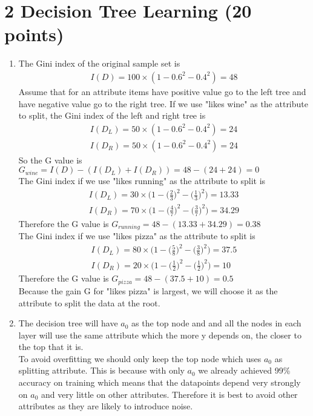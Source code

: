 \documentclass[12pt]{article}
\begin{document}
\section*{2 Decision Tree Learning (20 points)}
\begin{enumerate}[label=(\alph*)]
	\item	
	The Gini index of the original sample set is
	\begin{align*}
		I(D) = 100 \times (1 - 0.6^2 - 0.4^2) = 48
	\end{align*}
	Assume that for an attribute items have positive value go to the left tree and have negative value go to the right tree. If we use "likes wine" as the attribute to split, the Gini index of the left and right tree is
	\begin{align*}
		I(D_L) = 50 \times (1 - 0.6^2 - 0.4^2) = 24\\
		I(D_R) = 50 \times (1 - 0.6^2 - 0.4^2) = 24
	\end{align*}
	So the G value is $G_{wine} = I(D) - (I(D_L) + I(D_R)) = 48 - (24 + 24) = 0$ \\
	The Gini index if we use "likes running" as the attribute to split is
	\begin{align*}
		I(D_L) = 30 \times \Big(1 - \big(\frac{2}{3}\big)^2 - \big(\frac{1}{3}\big)^2\Big) = 13.33 \\
		I(D_R) = 70 \times \Big(1 - \big(\frac{4}{7}\big)^2 - \big(\frac{3}{7}\big)^2\Big) = 34.29
	\end{align*}
	Therefore the G value is $G_{running} = 48 - (13.33 + 34.29) = 0.38$ \\
	The Gini index if we use "likes pizza" as the attribute to split is
	\begin{align*}
		I(D_L) = 80 \times \Big(1 - \big(\frac{5}{8}\big)^2 - \big(\frac{3}{8}\big)^2\Big) = 37.5 \\
		I(D_R) = 20 \times \Big(1 - \big(\frac{1}{2}\big)^2 - \big(\frac{1}{2}\big)^2\Big) = 10
	\end{align*}
	Therefore the G value is $G_{pizza} = 48 - (37.5 + 10) = 0.5$ \\
	Because the gain G for "likes pizza" is largest, we will choose it as the attribute to split the data at the root.
	\item
	The decision tree will have $a_0$ as the top node and and all the nodes in each layer will use the same attribute which the more y depends on, the closer to the top that it is. \\
	To avoid overfitting we should only keep the top node which uses $a_0$ as splitting attribute. This is because with only $a_0$ we already achieved 99\% accuracy on training which means that the datapoints depend very strongly on $a_0$ and very little on other attributes. Therefore it is best to avoid other attributes as they are likely to introduce noise.
\end{enumerate}
\end{document}
